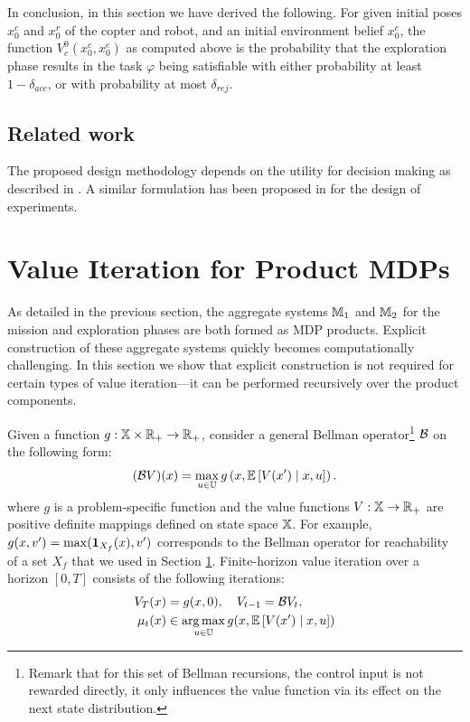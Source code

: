\documentclass[conference]{IEEEtran}
\renewcommand{\cite}[1]{\citep{#1}}
\newcommand{\sofieNew}[1]{{\color{blue}#1}}
\begin{document}
In conclusion, in this section we have derived the following. For given initial poses $x^c_0$ and $x^r_0$ of the copter and robot, and an initial environment belief $x^e_0$, the function $V^0_c(x^c_0, x^e_0)$ as computed above is the probability that the exploration phase results in the task $\varphi$ being satisfiable with either probability at least $1- \delta_{acc}$, or with probability at most $\delta_{rej}$.
\subsection{Related work}
\sofieNew{The proposed design methodology depends on the utility for decision making as described in \cite{lindley2000philosophy}.  A similar formulation has been proposed in \cite{haesaert2016experiment} for the design of experiments.}

\section{ Value Iteration for Product MDPs}
\label{sec:valueiter}

As detailed in the previous section, the aggregate systems $\mathbb{M}_1$ and $\mathbb{M}_2$ for the mission and exploration phases are both formed as MDP products. Explicit construction of these aggregate systems quickly becomes computationally challenging. In this section we show that explicit construction is not required for certain types of value iteration---it can be performed recursively over the product components.

Given a function $g: \mathbb{X} \times \mathbb{R}_+ \rightarrow \mathbb{R}_+$, consider a general Bellman operator\footnote{\sofieNew{Remark that for this set of Bellman recursions, the control input is not rewarded directly, it only influences the value function via its effect on the next state distribution.}} $\mathcal{B}$ on the following form:
\begin{equation}
(\mathcal{B} V) (x) =  \max_{u \in \mathbb{U}} g \left( x, \mathbb E \left[  V(x') \mid x,u \right] \right).
\end{equation}
where $g$ is a problem-specific function and the value functions $V:\mathbb{X}\rightarrow \mathbb{R}_+$ are positive definite mappings defined on state space $\mathbb{X}$. For example, $g(x, v') = \max(\mathbf{1}_{X_f}(x), v')$ corresponds to the Bellman operator for reachability of a set $X_f$ that we used in Section \ref{sec:valueiter}. Finite-horizon value iteration over a horizon $[0, T]$ consists of the following iterations:
\begin{equation}
\begin{aligned}
	V_T(x) & = g(x, 0), \quad V_{t-1} = \mathcal{B} V_t,\\
	\mu_t(x) & \in \operatorname*{arg\,max}_{u \in \mathbb{U}} g(x, \mathbb{E}\left[ V(x') \mid x,u \right])
\end{aligned}
\end{equation}
\end{document}

